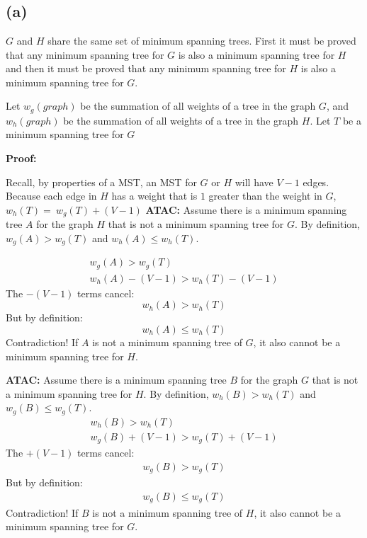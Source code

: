 \section{}
\subsection*{(a)}

$G$ and $H$ share the same set of minimum spanning trees. First it must be proved that any minimum spanning tree for $G$ is also a minimum spanning tree for $H$ and then it must be proved that any minimum spanning tree for $H$ is also a minimum spanning tree for $G$.

Let $w_g(graph)$ be the summation of all weights of a tree in the graph $G$, and $w_h(graph)$ be the summation of all weights of a tree in the graph $H$.
Let $T$ be a minimum spanning tree for $G$

\textbf{Proof:}

Recall, by properties of a MST, an MST for $G$ or $H$ will have $V-1$ edges. Because each edge in $H$ has a weight that is $1$ greater than the weight in $G$, $w_h\left(T\right)=\ w_g\left(T\right)+(V-1)$
\textbf{ATAC:} Assume there is a minimum spanning tree $A$ for the graph $H$ that is not a minimum spanning tree for $G$. By definition, $w_g\left(A\right)>w_g\left(T\right)$ and $w_h\left(A\right)\le w_h\left(T\right)$.

\begin{eqnarray}
    w_g\left(A\right)>w_g\left(T\right) \\
    w_h\left(A\right)-\left(V-1\right)>w_h\left(T\right)-(V-1)
\end{eqnarray}
The $-(V-1)$ terms cancel:
\begin{equation}
    w_h\left(A\right)>w_h\left(T\right)
\end{equation}
But by definition:
\begin{equation}
    w_h\left(A\right)\le w_h\left(T\right)
\end{equation}
Contradiction! If $A$ is not a minimum spanning tree of $G$, it also cannot be a minimum spanning tree for $H$.

\textbf{ATAC:} Assume there is a minimum spanning tree $B$ for the graph $G$ that is not a minimum spanning tree for $H$. By definition, $w_h\left(B\right)>w_h\left(T\right)$ and $w_g\left(B\right)\le w_g\left(T\right)$.
\begin{eqnarray}
    w_h\left(B\right)>w_h\left(T\right) \\
    w_g\left(B\right)+(V-1)>w_g\left(T\right)+(V-1)
\end{eqnarray}
The $+(V-1)$ terms cancel:
\begin{eqnarray}
    w_g\left(B\right)>w_g\left(T\right)
\end{eqnarray}
But by definition:
\begin{eqnarray}
    w_g\left(B\right)\le w_g\left(T\right)
\end{eqnarray}
Contradiction! If $B$ is not a minimum spanning tree of $H$, it also cannot be a minimum spanning tree for $G$.

